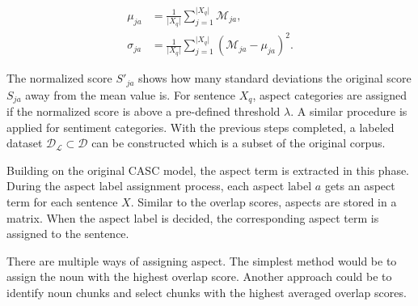 \documentclass[american, oneside]{ecsgdp}
\begin{document}
\begin{align}
    \mu_{ja}    & = \frac{1}{\lvert X_q \rvert} \sum_{j=1}^{\lvert X_q \rvert} \mathcal{M}_{ja}, \\
    \sigma_{ja} & = \frac{1}{\lvert X_q \rvert} \sum_{j=1}^{\lvert X_q \rvert} \left ( \mathcal{M}_{ja} - \mu_{ja} \right )^2.
\end{align}

The normalized score $S'_{ja}$ shows how many standard deviations the original score $S_{ja}$ away from the mean value is. For sentence $X_q$, aspect categories are assigned if the normalized score is above a pre-defined threshold $\lambda$. 
A similar procedure is applied for sentiment categories. With the previous steps completed, a labeled dataset $\mathcal{D}_\mathcal{L} \subset \mathcal{D}$ can be constructed which is a subset of the original corpus.

Building on the original CASC model, the aspect term is extracted in this phase. During the aspect label assignment process, each aspect label $a$ gets an aspect term for each sentence $X$. Similar to the overlap scores, aspects are stored in a matrix. When the aspect label is decided, the corresponding aspect term is assigned to the sentence.

There are multiple ways of assigning aspect. The simplest method would be to assign the noun with the highest overlap score. Another approach could be to identify noun chunks \parencite{Honnibal2020Spacy} and select chunks with the highest averaged overlap scores. 

\end{document}
